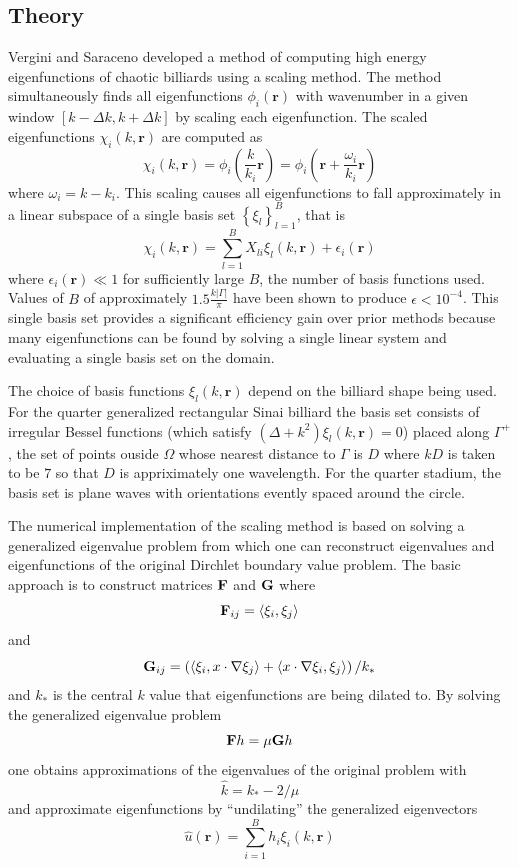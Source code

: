 \documentclass{report}
\newcommand{\rr}[0]{\mathbf{r}}
\begin{document}
\subsection{Theory}
Vergini and Saraceno \cite{vergini} developed a method of computing high energy eigenfunctions of chaotic billiards using a scaling method. The method simultaneously finds all eigenfunctions $\phi_{i}(\rr)$ with wavenumber in a given window $[k - \Delta k, k + \Delta k]$ by scaling each eigenfunction. The scaled eigenfunctions $\chi_{i}(k, \rr)$ are computed as
\[
\chi_{i}(k, \rr) = \phi_{i} \left( \frac{k}{k_{i}} \rr \right) = \phi_{i} \left( \rr + \frac{\omega_{i}}{k_i} \rr \right)
\]
where $\omega_{i} = k - k_i$. This scaling causes all eigenfunctions to fall approximately in a linear subspace of a single basis set $\left\{ \xi_{l} \right\}_{l=1}^{B}$, that is
\[
\chi_{i}(k, \rr) = \sum_{l=1}^{B} X_{li} \xi_{l}(k, \rr) + \epsilon_{i}(\rr)
\]
where $\epsilon_{i}(\rr) \ll 1$ for sufficiently large $B$, the number of basis functions used. Values of $B$ of approximately $1.5 \frac{k \vert \Gamma \vert}{\pi}$ have been shown to produce $\epsilon < 10^{-4}$. This single basis set provides a significant efficiency gain over prior methods because many eigenfunctions can be found by solving a single linear system and evaluating a single basis set on the domain.

The choice of basis functions $\xi_{l}(k, \rr)$ depend on the billiard shape being used. For the quarter generalized rectangular Sinai billiard the basis set consists of irregular Bessel functions (which satisfy $(\Delta + k^2)\xi_{l}(k, \rr) = 0$) placed along $\Gamma^{+}$, the set of points ouside $\Omega$ whose nearest distance to $\Gamma$ is $D$ where $kD$ is taken to be $7$ so that $D$ is appriximately one wavelength. For the quarter stadium, the basis set is plane waves with orientations evently spaced around the circle.

The numerical implementation of the scaling method is based on solving a generalized eigenvalue problem from which one can reconstruct eigenvalues and eigenfunctions of the original Dirchlet boundary value problem. The basic approach is to construct matrices ${\bf F}$ and ${\bf G}$ where
\[
{\bf F}_{ij} = \langle \xi_{i}, \xi_{j} \rangle
\] 
and
\[
{\bf G}_{ij} = \left( \langle \xi_{i}, x \cdot \nabla \xi_{j} \rangle + \langle x \cdot \nabla \xi_{i}, \xi_{j} \rangle \right) / k_{*}
\]
and $k_{*}$ is the central $k$ value that eigenfunctions are being dilated to. By solving the generalized eigenvalue problem
\[
{\bf F} h = \mu {\bf G} h
\]
one obtains approximations of the eigenvalues of the original problem with
\[
\hat{k} = k_{*} - 2/\mu
\]
and approximate eigenfunctions by ``undilating'' the generalized eigenvectors
\[
\hat{u}(\rr) = \sum_{i=1}^{B} h_{i} \xi_{i}(k, \rr)
\]
\end{document}
